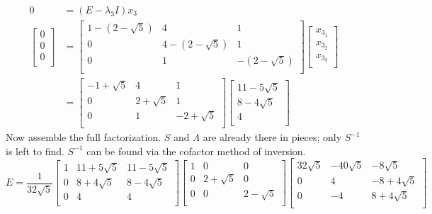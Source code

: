 \documentclass[titlepage]{article}
\begin{document}
\begin{align*}
    0 &= (E-\lambda_3I)x_3\\
    \begin{bmatrix}
        0\\
        0\\
        0\\
    \end{bmatrix}
    &=
    \begin{bmatrix}
        1-(2-\sqrt{5}) & 4 & 1\\
        0 & 4-(2-\sqrt{5}) & 1\\
        0 & 1 & -(2-\sqrt{5})\\
    \end{bmatrix}
    \begin{bmatrix}
        x_{3_1}\\
        x_{3_2}\\
        x_{3_3}\\
    \end{bmatrix}\\
    &=
    \begin{bmatrix}
        -1+\sqrt{5} & 4 & 1\\
        0 & 2+\sqrt{5} & 1\\
        0 & 1 & -2+\sqrt{5}\\
    \end{bmatrix}
    \begin{bmatrix}
        11-5\sqrt{5}\\
        8-4\sqrt{5}\\
        4\\
    \end{bmatrix}
\end{align*}
Now assemble the full factorization. $S$ and $\Lambda$ are already there in pieces; only $S^{-1}$ is left to find. $S^{-1}$ can be found via the cofactor method of inversion.
\begin{equation*}
    E = \frac{1}{32\sqrt{5}}
    \begin{bmatrix}
        1 & 11+5\sqrt{5} & 11-5\sqrt{5}\\
        0 & 8+4\sqrt{5} & 8-4\sqrt{5}\\
        0 & 4 & 4\\
    \end{bmatrix}
    \begin{bmatrix}
        1 & 0 & 0\\
        0 & 2+\sqrt{5} & 0\\
        0 & 0 & 2-\sqrt{5}\\
    \end{bmatrix}
    \begin{bmatrix}
        32\sqrt{5} & -40\sqrt{5} & -8\sqrt{5}\\
        0 & 4 & -8+4\sqrt{5}\\
        0 & -4 & 8+4\sqrt{5}\\
    \end{bmatrix}
\end{equation*}\par
\end{document}

